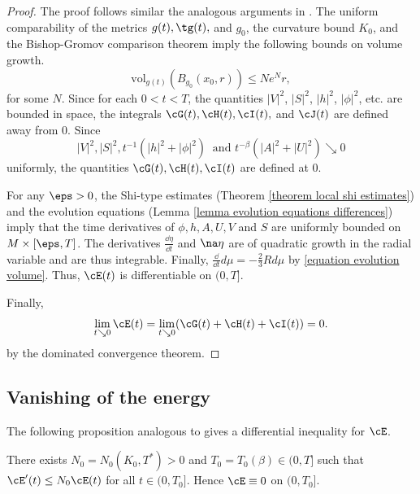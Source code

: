 \documentclass[hidelinks, 12pt, oneside, reqno]{amsart}
\begin{document}
\begin{proof}
    The proof follows similar the analogous arguments in \cite[\S 2.2]{kotschwarEnergy}. The uniform comparability of the metrics $g(t),\tg(t),$ and $g_0$, the curvature bound $K_0$, and the Bishop-Gromov comparison theorem imply the following bounds on volume growth.
    \[
    \mathrm{vol}_{g(t)}(B_{g_0}(x_0, r)) \le Ne^Nr, 
    \]
    for some $N$. Since for each $0 < t < T$, the quantities $|V|^2$, $|S|^2$, $|h|^2$, $|\phi|^2$, etc. are bounded in space, the integrals $\cG(t), \cH(t), \cI(t),$ and $\cJ(t)$ are defined away from $0$. Since 
    \[
    |V|^2, |S|^2, t^{-1}(|h|^2 + |\phi|^2) \;\; \text{and } t^{-\beta} (|A|^2 + |U|^2) \searrow 0
    \]
    uniformly, the quantities $\cG(t), \cH(t), \cI(t)$ are defined at $0$. 
    
    For any $\eps > 0$, the Shi-type estimates (Theorem \ref{theorem local shi estimates}) and the evolution equations (Lemma \ref{lemma evolution equations differences}) imply that the time derivatives of $\phi, h, A, U, V$ and $S$ are uniformly bounded on $M \times [\eps, T]$. The derivatives $\frac{\dd \eta}{\dd t}$ and $\na \eta$ are of quadratic growth in the radial variable and are thus integrable. Finally, $\frac{\dd}{\dd t} d\mu = -\frac23 R d\mu$ by \eqref{equation evolution volume}. Thus, $\cE(t)$ is differentiable on $(0,T]$. 

    Finally, 
    \[
    \lim_{t\searrow 0} \cE(t) = \lim_{t\searrow 0} (\cG(t) + \cH(t) + \cI(t)) = 0.
    \]
    by the dominated convergence theorem.
\end{proof}

\subsection{Vanishing of the energy} The following proposition analogous to \cite[Proposition 7]{kotschwarEnergy} gives a differential inequality for $\cE$.

\begin{prop}\label{proposition diff ineq for E}
There exists $N_0 = N_0(K_0, T^*) >0$ and $T_0=  T_0(\beta) \in (0,T]$ such that $\cE'(t) \le N_0 \cE(t)$ for all $t \in (0,T_0]$. Hence $\cE \equiv 0$ on $(0,T_0]$.
\end{prop}
\end{document}
